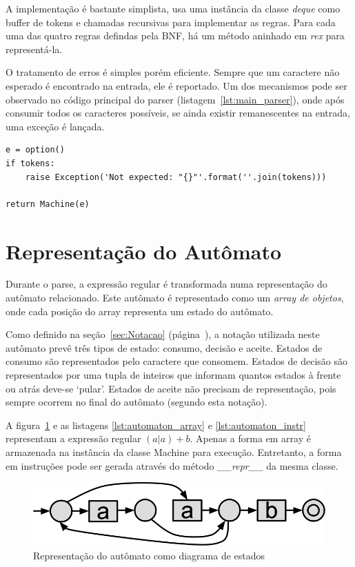 \documentclass[a4paper,12pt,oneside,onecolumn]{uerj}
\begin{document}
A implementação é bastante simplista, usa uma instância da classe \emph{deque} como buffer de tokens e chamadas recursivas para implementar as regras. Para cada uma das quatro regras defindas pela BNF, há um método aninhado em \emph{rex} para representá-la.

O tratamento de erros é simples porém eficiente. Sempre que um caractere não esperado é encontrado na entrada, ele é reportado. Um dos mecanismos pode ser observado no código principal do parser (listagem~\ref{lst:main_parser}), onde após consumir todos os caracteres possíveis, se ainda existir remanescentes na entrada, uma exceção é lançada.

\vspace{0.5cm}
\begin{lstlisting}[caption={Implementação top-level do parser},label=lst:main_parser]
e = option()
if tokens: 
    raise Exception('Not expected: "{}"'.format(''.join(tokens)))

return Machine(e)
\end{lstlisting}

\section{Representação do Autômato}

Durante o parse, a expressão regular é transformada numa representação do autômato relacionado. Este autômato é representado como um \emph{array de objetos}, onde cada posição do array representa um estado do autômato.

Como definido na seção~\ref{sec:Notacao} (página~\pageref{sec:Notacao}), a notação utilizada neste autômato prevê três tipos de estado: consumo, decisão e aceite. Estados de consumo são representados pelo caractere que consomem. Estados de decisão são representados por uma tupla de inteiros que informam quantos estados à frente ou atrás deve-se `pular'. Estados de aceite não precisam de representação, pois sempre ocorrem no final do autômato (segundo esta notação).

A figura~\ref{fig:exemplo_automato_puro} e as listagens \ref{lst:automaton_array} e \ref{lst:automaton_instr} representam a expressão regular $(a|a)+b$. Apenas a forma em array é armazenada na instância da classe Machine para execução. Entretanto, a forma em instruções pode ser gerada através do método \emph{\_\_repr\_\_} da mesma classe.

\begin{figure}[ht]
  \centering
  \includegraphics[scale=0.4]{figures/exemplo_automato_puro.png}
  \caption{Representação do autômato como diagrama de estados}
  \label{fig:exemplo_automato_puro}
\end{figure}
\end{document}
